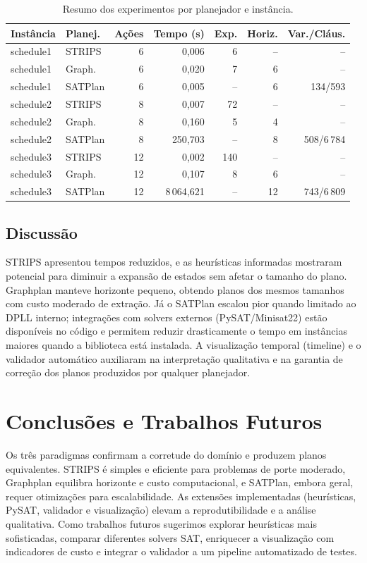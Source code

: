 \documentclass[12pt]{article}
\begin{document}
\begin{table}[ht]
\centering
\caption{Resumo dos experimentos por planejador e instância.}
\label{tab:resultados}
\small
\begin{tabular}{llrrrrr}
\toprule
Instância & Planej. & Ações & Tempo (s) & Exp. & Horiz. & Var./Cláus. \\
\midrule
schedule1 & STRIPS & 6 & 0{,}006 & 6 & -- & -- \\
schedule1 & Graph. & 6 & 0{,}020 & 7 & 6 & -- \\
schedule1 & SATPlan & 6 & 0{,}005 & -- & 6 & 134/593 \\
schedule2 & STRIPS & 8 & 0{,}007 & 72 & -- & -- \\
schedule2 & Graph. & 8 & 0{,}160 & 5 & 4 & -- \\
schedule2 & SATPlan & 8 & 250{,}703 & -- & 8 & 508/6\,784 \\
schedule3 & STRIPS & 12 & 0{,}002 & 140 & -- & -- \\
schedule3 & Graph. & 12 & 0{,}107 & 8 & 6 & -- \\
schedule3 & SATPlan & 12 & 8\,064{,}621 & -- & 12 & 743/6\,809 \\
\bottomrule
\end{tabular}
\end{table}

\subsection{Discussão}
STRIPS apresentou tempos reduzidos, e as heurísticas informadas mostraram potencial para diminuir a expansão de estados sem afetar o tamanho do plano. Graphplan manteve horizonte pequeno, obtendo planos dos mesmos tamanhos com custo moderado de extração. Já o SATPlan escalou pior quando limitado ao DPLL interno; integrações com solvers externos (PySAT/Minisat22) estão disponíveis no código e permitem reduzir drasticamente o tempo em instâncias maiores quando a biblioteca está instalada. A visualização temporal (timeline) e o validador automático auxiliaram na interpretação qualitativa e na garantia de correção dos planos produzidos por qualquer planejador.

\section{Conclusões e Trabalhos Futuros}
Os três paradigmas confirmam a corretude do domínio e produzem planos equivalentes. STRIPS é simples e eficiente para problemas de porte moderado, Graphplan equilibra horizonte e custo computacional, e SATPlan, embora geral, requer otimizações para escalabilidade. As extensões implementadas (heurísticas, PySAT, validador e visualização) elevam a reprodutibilidade e a análise qualitativa. Como trabalhos futuros sugerimos explorar heurísticas mais sofisticadas, comparar diferentes solvers SAT, enriquecer a visualização com indicadores de custo e integrar o validador a um pipeline automatizado de testes.
\end{document}
